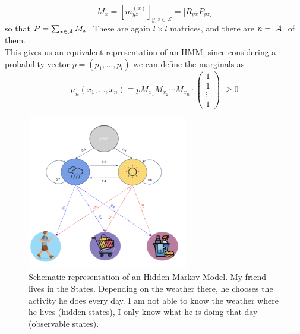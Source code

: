 \begin{equation}
    M_x = [m_{yz}^{(x)}]_{y, z \in \mathcal{L}} = \big[ R_{yx} P_{yz} \big]
\end{equation}
so that $P = \sum_{x \in \mathcal{A}} M_x$. These are again $l \times l$ matrices, and there are $n = |\mathcal{A}|$ of them.
\\This gives us an equivalent representation of an HMM, since considering a probability vector $p = (p_1, \dots, p_l)$ we can define the marginals as 
\begin{equation}
    \mu_n (x_1, \dots, x_n) \equiv p M_{x_1} M_{x_2} \cdots M_{x_n} \cdot 
    \begin{pmatrix}
        1 \\
        1 \\
        \vdots \\
        1
    \end{pmatrix} 
    \,\, \geq 0
\end{equation}

\begin{figure}[h]
    \centering
    \includegraphics[width=7cm]{img/HMM1.png}
    \caption{Schematic representation of an Hidden Markov Model. My friend lives in the States. Depending on the weather there, he chooses the activity he does every day. I am not able to know the weather where he lives (hidden states), I only know what he is doing that day (observable states).}
    \label{fig:HMM1}
\end{figure}

